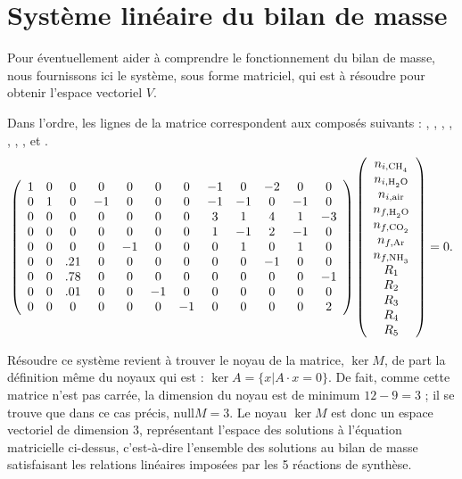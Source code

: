 \section{Système linéaire du bilan de masse}\label{appendix:matrix}

Pour éventuellement aider à comprendre le fonctionnement du bilan de masse, nous fournissons ici le système, sous forme matriciel, qui est à résoudre pour obtenir l'espace vectoriel $V$.

Dans l'ordre, les lignes de la matrice correspondent aux composés suivants : , , , , , ,  ,  et .
\[
    \left(
    \begin{array}{*{12}c}
      1 & 0 & 0 & 0 & 0 & 0 & 0 & -1 & 0 & -2 & 0 & 0 \\
      0 & 1 & 0 & -1 & 0 & 0 & 0 & -1 & -1 & 0 & -1 & 0 \\
      0 & 0 & 0 & 0 & 0 & 0 & 0 & 3 & 1 & 4 & 1 & -3 \\
      0 & 0 & 0 & 0 & 0 & 0 & 0 & 1 & -1 & 2 & -1 & 0 \\
      0 & 0 & 0 & 0 & -1 & 0 & 0 & 0 & 1 & 0 & 1 & 0 \\
      0 & 0 & .21 & 0 & 0 & 0 & 0 & 0 & 0 & -1 & 0 & 0 \\
      0 & 0 & .78 & 0 & 0 & 0 & 0 & 0 & 0 & 0 & 0 & -1 \\
      0 & 0 & .01 & 0 & 0 & -1 & 0 & 0 & 0 & 0 & 0 & 0 \\
      0 & 0 & 0 & 0 & 0 & 0 & -1 & 0 & 0 & 0 & 0 & 2
    \end{array}
    \right)
    \left(
    \begin{array}{*{1}c}
      n_{i,\ce{CH4}} \\ n_{i,\ce{H2O}} \\ n_{i,\text{air}} \\ n_{f,\ce{H2O}} \\ n_{f,\ce{CO2}} \\ n_{f,\ce{Ar}} \\ n_{f,\ce{NH3}} \\ R_1 \\ R_2 \\ R_3 \\ R_4 \\ R_5
    \end{array}
    \right)
    = 0
    \text.
\]

Résoudre ce système revient à trouver le noyau de la matrice, $\ker{M}$, de part la définition même du noyaux qui est : $\ker{A} = \{x\vert{}A\cdot x =0\}$. De fait, comme cette matrice n'est pas carrée, la dimension du noyau est de minimum $12-9=3$ ; il se trouve que dans ce cas précis, $\mathrm{null}{M} = 3$. Le noyau $\ker{M}$ est donc un espace vectoriel de dimension 3, représentant l'espace des solutions à l'équation matricielle ci-dessus, c'est-à-dire l'ensemble des solutions au bilan de masse satisfaisant les relations linéaires imposées par les 5 réactions de synthèse.
